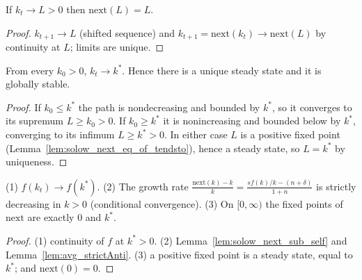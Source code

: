 \begin{lemma}
\label{lem:solow_next_eq_of_tendsto}
\leanok
{}
If $k_t \to L > 0$ then $\mathrm{next}(L) = L$.
\end{lemma}
\begin{proof}
\leanok
$k_{t+1} \to L$ (shifted sequence) and $k_{t+1} = \mathrm{next}(k_t) \to \mathrm{next}(L)$ by continuity at $L$;
limits are unique.
\end{proof}

\begin{theorem}
\label{thm:solow_tendsto}
\leanok
{}
From every $k_0 > 0$, $k_t \to k^*$. Hence there is a unique steady state and it is globally stable.
\end{theorem}
\begin{proof}
\leanok
If $k_0 \le k^*$ the path is nondecreasing and bounded by $k^*$, so it converges to its supremum
$L \ge k_0 > 0$. If $k_0 \ge k^*$ it is nonincreasing and bounded below by $k^*$, converging to its infimum
$L \ge k^* > 0$. In either case $L$ is a positive fixed point (Lemma~\ref{lem:solow_next_eq_of_tendsto}),
hence a steady state, so $L = k^*$ by uniqueness.
\end{proof}

\begin{corollary}
\label{cor:solow_consequences}
\leanok
{}
(1) $f(k_t) \to f(k^*)$. (2) The growth rate $\frac{\mathrm{next}(k) - k}{k} = \frac{s f(k)/k - (n+\delta)}{1 + n}$
is strictly decreasing in $k > 0$ (conditional convergence). (3) On $[0, \infty)$ the fixed points of
$\mathrm{next}$ are exactly $0$ and $k^*$.
\end{corollary}
\begin{proof}
\leanok
(1) continuity of $f$ at $k^* > 0$. (2) Lemma~\ref{lem:solow_next_sub_self} and
Lemma~\ref{lem:avg_strictAnti}. (3) a positive fixed point is a steady state, equal to $k^*$; and
$\mathrm{next}(0) = 0$.
\end{proof}

